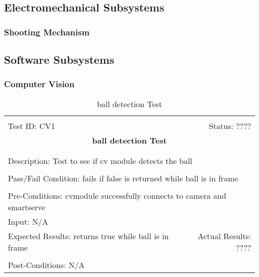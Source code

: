 \documentclass[11pt]{article}
\begin{document}
\subsection{Electromechanical Subsystems}
\subsubsection{Shooting Mechanism}
\subsection{Software Subsystems}
\subsubsection{Computer Vision}

\begin{center}
\begin{table}[H]
\begin{tabular}{|l r|}\hline&\\[-2mm]
	Test ID: CV1	&Status: ????\\[-3mm]
	\multicolumn{2}{|c|}{\textbf{\large{ball detection Test}}}\\&\\\hline&\\[-3mm]
	\multicolumn{2}{|p{\textwidth}|}{Description: Test to see if cv module detects the ball}\\[1mm]\hline&\\[-3mm]
	\multicolumn{2}{|p{\textwidth}|}{Pass/Fail Condition: fails if false is returned while ball is in frame}\\[1mm]\hline&\\[-3mm]
	\multicolumn{2}{|p{\textwidth}|}{Pre-Conditions: cvmodule successfully connects to camera and smartserve}\\[4mm]
	\multicolumn{2}{|p{\textwidth}|}{Input: N/A}\\[2mm]\hline
	\multicolumn{1}{|p{0.49\textwidth}}{Expected Results: returns true while ball is in frame}	&\multicolumn{1}{|p{0.45\textwidth}|}{Actual Results: ????}\\\hline&\\[-3mm]
	\multicolumn{2}{|p{\textwidth}|}{Post-Conditions: N/A}\\\hline
\end{tabular}
\caption{ball detection Test}
\end{table}
\end{center}
\end{document}
